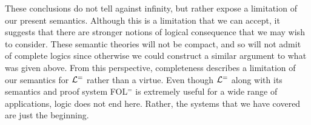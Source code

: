 These conclusions do not tell against infinity, but rather expose a limitation of our present semantics.
Although this is a limitation that we can accept, it suggests that there are stronger notions of logical consequence that we may wish to consider.
These semantic theories will not be compact, and so will not admit of complete logics since otherwise we could construct a similar argument to what was given above.
From this perspective, completeness describes a limitation of our semantics for $\mathcal{L}^{=}$ rather than a virtue.
Even though $\mathcal{L}^{=}$ along with its semantics and proof system FOL$^=$ is extremely useful for a wide range of applications, logic does not end here. 
Rather, the systems that we have covered are just the beginning.



%


\iffalse

\practiceproblems

